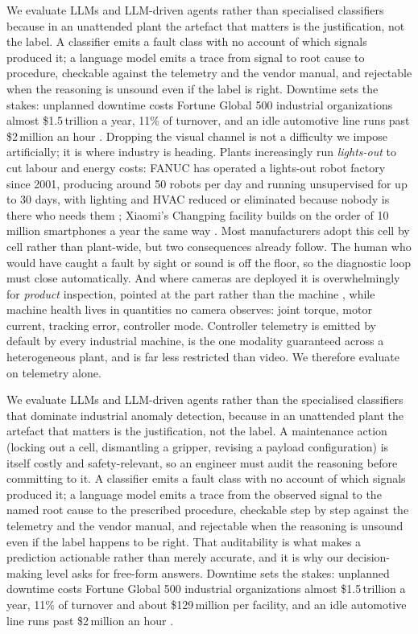 We evaluate LLMs and LLM-driven agents rather than specialised classifiers because in an unattended plant the artefact that matters is the justification, not the label. A classifier emits a fault class with no account of which signals produced it; a language model emits a trace from signal to root cause to procedure, checkable against the telemetry and the vendor manual, and rejectable when the reasoning is unsound even if the label is right. Downtime sets the stakes: unplanned downtime costs Fortune Global 500 industrial organizations almost \$1.5\,trillion a year, 11\% of turnover, and an idle automotive line runs past \$2\,million an hour \cite{siemens2023downtime}.
\else
Dropping the visual channel is not a difficulty we impose artificially; it is where industry is heading. Plants increasingly run \emph{lights-out} to cut labour and energy costs: FANUC has operated a lights-out robot factory since 2001, producing around 50 robots per day and running unsupervised for up to 30 days, with lighting and HVAC reduced or eliminated because nobody is there who needs them \cite{imts2026lightsout}; Xiaomi's Changping facility builds on the order of 10 million smartphones a year the same way \cite{metrology2024darkfactory}. Most manufacturers adopt this cell by cell rather than plant-wide, but two consequences already follow. The human who would have caught a fault by sight or sound is off the floor, so the diagnostic loop must close automatically. And where cameras are deployed it is overwhelmingly for \emph{product} inspection, pointed at the part rather than the machine \cite{metrology2024darkfactory}, while machine health lives in quantities no camera observes: joint torque, motor current, tracking error, controller mode. Controller telemetry is emitted by default by every industrial machine, is the one modality guaranteed across a heterogeneous plant, and is far less restricted than video. We therefore evaluate on telemetry alone.

We evaluate LLMs and LLM-driven agents rather than the specialised classifiers that dominate industrial anomaly detection, because in an unattended plant the artefact that matters is the justification, not the label. A maintenance action (locking out a cell, dismantling a gripper, revising a payload configuration) is itself costly and safety-relevant, so an engineer must audit the reasoning before committing to it. A classifier emits a fault class with no account of which signals produced it; a language model emits a trace from the observed signal to the named root cause to the prescribed procedure, checkable step by step against the telemetry and the vendor manual, and rejectable when the reasoning is unsound even if the label happens to be right. That auditability is what makes a prediction actionable rather than merely accurate, and it is why our decision-making level asks for free-form answers. Downtime sets the stakes: unplanned downtime costs Fortune Global 500 industrial organizations almost \$1.5\,trillion a year, 11\% of turnover and about \$129\,million per facility, and an idle automotive line runs past \$2\,million an hour \cite{siemens2023downtime}.
\fi
